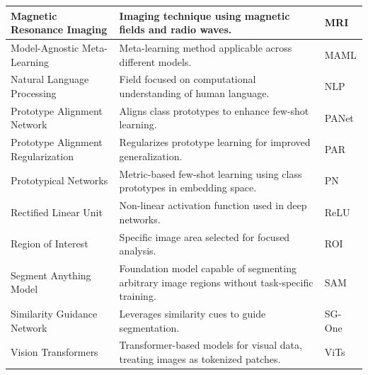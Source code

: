 \begin{longtable}{|p{3cm}|p{8cm}|p{3cm}|}
\hline
Magnetic Resonance Imaging & Imaging technique using magnetic fields and radio waves. & MRI \\ 
\hline
Model-Agnostic Meta-Learning & Meta-learning method applicable across different models. & MAML \\ 
\hline
Natural Language Processing & Field focused on computational understanding of human language. & NLP \\ 
\hline
Prototype Alignment Network & Aligns class prototypes to enhance few-shot learning. & PANet \\ 
\hline
Prototype Alignment Regularization & Regularizes prototype learning for improved generalization. & PAR \\ 
\hline
Prototypical Networks & Metric-based few-shot learning using class prototypes in embedding space. & PN \\ 
\hline
Rectified Linear Unit & Non-linear activation function used in deep networks. & ReLU \\ 
\hline
Region of Interest & Specific image area selected for focused analysis. & ROI \\
\hline
Segment Anything Model & Foundation model capable of segmenting arbitrary image regions without task-specific training. & SAM \\ 
\hline
Similarity Guidance Network & Leverages similarity cues to guide segmentation. & SG-One \\ 
\hline
Vision Transformers & Transformer-based models for visual data, treating images as tokenized patches. & ViTs \\ 
\hline
\end{longtable}